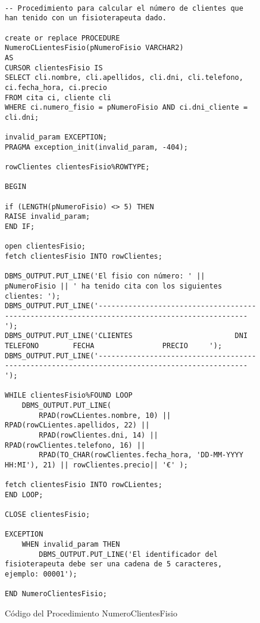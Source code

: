 \begin{figure}[H]
    \begin{tcolorbox}[sharp corners, colback=yellow!30, colframe=white!20]
        \tiny
        \begin{verbatim}

-- Procedimiento para calcular el número de clientes que han tenido con un fisioterapeuta dado.

create or replace PROCEDURE NumeroCLientesFisio(pNumeroFisio VARCHAR2)
AS
CURSOR clientesFisio IS
SELECT cli.nombre, cli.apellidos, cli.dni, cli.telefono, ci.fecha_hora, ci.precio
FROM cita ci, cliente cli
WHERE ci.numero_fisio = pNumeroFisio AND ci.dni_cliente = cli.dni;

invalid_param EXCEPTION;
PRAGMA exception_init(invalid_param, -404);

rowClientes clientesFisio%ROWTYPE;

BEGIN

if (LENGTH(pNumeroFisio) <> 5) THEN
RAISE invalid_param;
END IF;

open clientesFisio;
fetch clientesFisio INTO rowClientes;

DBMS_OUTPUT.PUT_LINE('El fisio con número: ' || pNumeroFisio || ' ha tenido cita con los siguientes clientes: ');
DBMS_OUTPUT.PUT_LINE('----------------------------------------------------------------------------------------------');
DBMS_OUTPUT.PUT_LINE('CLIENTES                        DNI           TELEFONO        FECHA                PRECIO     ');
DBMS_OUTPUT.PUT_LINE('----------------------------------------------------------------------------------------------');

WHILE clientesFisio%FOUND LOOP
    DBMS_OUTPUT.PUT_LINE(
        RPAD(rowCLientes.nombre, 10) || RPAD(rowCLientes.apellidos, 22) ||
        RPAD(rowClientes.dni, 14) || RPAD(rowClientes.telefono, 16) ||
        RPAD(TO_CHAR(rowClientes.fecha_hora, 'DD-MM-YYYY HH:MI'), 21) || rowClientes.precio|| '€' );

fetch clientesFisio INTO rowCLientes;
END LOOP;

CLOSE clientesFisio;

EXCEPTION
    WHEN invalid_param THEN
        DBMS_OUTPUT.PUT_LINE('El identificador del fisioterapeuta debe ser una cadena de 5 caracteres, ejemplo: 00001');

END NumeroClientesFisio;
        \end{verbatim}
    \end{tcolorbox}
    \caption{Código del Procedimiento NumeroClientesFisio}
\end{figure}


